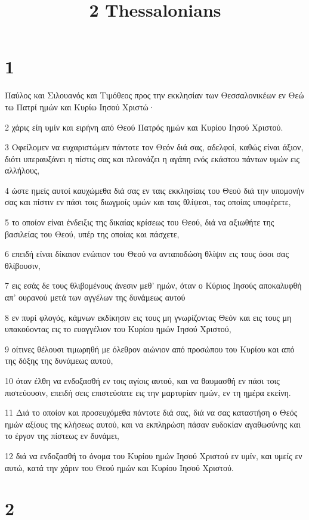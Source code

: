 

\title{2 Thessalonians}


\chapter{1}

\par Παύλος και Σιλουανός και Τιμόθεος προς την εκκλησίαν των Θεσσαλονικέων εν Θεώ τω Πατρί ημών και Κυρίω Ιησού Χριστώ·
\par 2 χάρις είη υμίν και ειρήνη από Θεού Πατρός ημών και Κυρίου Ιησού Χριστού.
\par 3 Οφείλομεν να ευχαριστώμεν πάντοτε τον Θεόν διά σας, αδελφοί, καθώς είναι άξιον, διότι υπεραυξάνει η πίστις σας και πλεονάζει η αγάπη ενός εκάστου πάντων υμών εις αλλήλους,
\par 4 ώστε ημείς αυτοί καυχώμεθα διά σας εν ταις εκκλησίαις του Θεού διά την υπομονήν σας και πίστιν εν πάσι τοις διωγμοίς υμών και ταις θλίψεσι, τας οποίας υποφέρετε,
\par 5 το οποίον είναι ένδειξις της δικαίας κρίσεως του Θεού, διά να αξιωθήτε της βασιλείας του Θεού, υπέρ της οποίας και πάσχετε,
\par 6 επειδή είναι δίκαιον ενώπιον του Θεού να ανταποδώση θλίψιν εις τους όσοι σας θλίβουσιν,
\par 7 εις εσάς δε τους θλιβομένους άνεσιν μεθ' ημών, όταν ο Κύριος Ιησούς αποκαλυφθή απ' ουρανού μετά των αγγέλων της δυνάμεως αυτού
\par 8 εν πυρί φλογός, κάμνων εκδίκησιν εις τους μη γνωρίζοντας Θεόν και εις τους μη υπακούοντας εις το ευαγγέλιον του Κυρίου ημών Ιησού Χριστού,
\par 9 οίτινες θέλουσι τιμωρηθή με όλεθρον αιώνιον από προσώπου του Κυρίου και από της δόξης της δυνάμεως αυτού,
\par 10 όταν έλθη να ενδοξασθή εν τοις αγίοις αυτού, και να θαυμασθή εν πάσι τοις πιστεύουσιν, επειδή σεις επιστεύσατε εις την μαρτυρίαν ημών, εν τη ημέρα εκείνη.
\par 11 Διά το οποίον και προσευχόμεθα πάντοτε διά σας, διά να σας καταστήση ο Θεός ημών αξίους της κλήσεως αυτού, και να εκπληρώση πάσαν ευδοκίαν αγαθωσύνης και το έργον της πίστεως εν δυνάμει,
\par 12 διά να ενδοξασθή το όνομα του Κυρίου ημών Ιησού Χριστού εν υμίν, και υμείς εν αυτώ, κατά την χάριν του Θεού ημών και Κυρίου Ιησού Χριστού.

\chapter{2}

